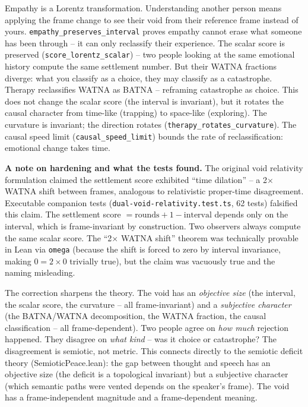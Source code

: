 \documentclass[
  11pt,
]{article}
\begin{document}
Empathy is a Lorentz transformation. Understanding another person means
applying the frame change to see their void from their reference frame
instead of yours. \texttt{empathy\_preserves\_interval} proves empathy
cannot erase what someone has been through -- it can only reclassify
their experience. The scalar score is preserved
(\texttt{score\_lorentz\_scalar}) -- two people looking at the same
emotional history compute the same settlement number. But their WATNA
fractions diverge: what you classify as a choice, they may classify as a
catastrophe. Therapy reclassifies WATNA as BATNA -- reframing
catastrophe as choice. This does not change the scalar score (the
interval is invariant), but it rotates the causal character from
time-like (trapping) to space-like (exploring). The curvature is
invariant; the direction rotates (\texttt{therapy\_rotates\_curvature}).
The causal speed limit (\texttt{causal\_speed\_limit}) bounds the rate
of reclassification: emotional change takes time.

\textbf{A note on hardening and what the tests found.} The original void
relativity formulation claimed the settlement score exhibited ``time
dilation'' -- a 2\(\times\) WATNA shift between frames, analogous to
relativistic proper-time disagreement. Executable companion tests
(\texttt{dual-void-relativity.test.ts}, 62 tests) falsified this claim.
The settlement score \(= \text{rounds} + 1 - \text{interval}\) depends
only on the interval, which is frame-invariant by construction. Two
observers always compute the same scalar score. The ``2\(\times\) WATNA
shift'' theorem was technically provable in Lean via \texttt{omega}
(because the shift is forced to zero by interval invariance, making
\(0 = 2 \times 0\) trivially true), but the claim was vacuously true and
the naming misleading.

The correction sharpens the theory. The void has an \emph{objective
size} (the interval, the scalar score, the curvature -- all
frame-invariant) and a \emph{subjective character} (the BATNA/WATNA
decomposition, the WATNA fraction, the causal classification -- all
frame-dependent). Two people agree on \emph{how much} rejection
happened. They disagree on \emph{what kind} -- was it choice or
catastrophe? The disagreement is semiotic, not metric. This connects
directly to the semiotic deficit theory (SemioticPeace.lean): the gap
between thought and speech has an objective size (the deficit is a
topological invariant) but a subjective character (which semantic paths
were vented depends on the speaker's frame). The void has a
frame-independent magnitude and a frame-dependent meaning.
\end{document}
